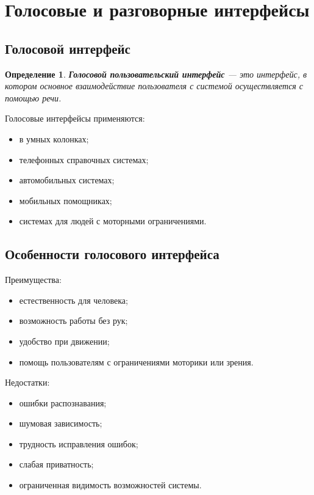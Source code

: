 \documentclass[12pt,a4paper]{article}
\newtheorem{definition}{Определение}
\begin{document}
\section{Голосовые и разговорные интерфейсы}

\subsection{Голосовой интерфейс}

\begin{definition}
\textbf{Голосовой пользовательский интерфейс} --- это интерфейс, в котором основное взаимодействие пользователя с системой осуществляется с помощью речи.
\end{definition}

Голосовые интерфейсы применяются:
\begin{itemize}
    \item в умных колонках;
    \item телефонных справочных системах;
    \item автомобильных системах;
    \item мобильных помощниках;
    \item системах для людей с моторными ограничениями.
\end{itemize}

\subsection{Особенности голосового интерфейса}

Преимущества:
\begin{itemize}
    \item естественность для человека;
    \item возможность работы без рук;
    \item удобство при движении;
    \item помощь пользователям с ограничениями моторики или зрения.
\end{itemize}

Недостатки:
\begin{itemize}
    \item ошибки распознавания;
    \item шумовая зависимость;
    \item трудность исправления ошибок;
    \item слабая приватность;
    \item ограниченная видимость возможностей системы.
\end{itemize}
\end{document}
